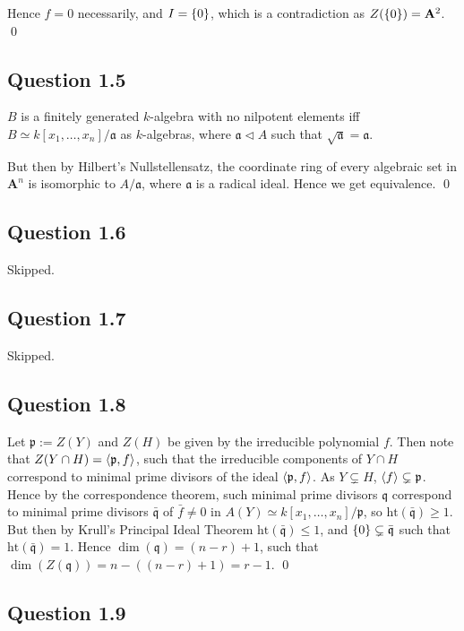 \documentclass{article}
\begin{document}
Hence $f=0$ necessarily, and $I=\{0\}$, which is a contradiction as $Z(\{0\}) = \mathbf{A}^2$. \qed

\subsection*{Question 1.5}

$B$ is a finitely generated $k$-algebra with no nilpotent elements iff $B \simeq k[x_1, \dots, x_n] / \mathfrak a$ as $k$-algebras, where $\mathfrak a \lhd A$ such that $\sqrt{\mathfrak a} = \mathfrak a$.

But then by Hilbert's Nullstellensatz, the coordinate ring of every algebraic set in $\mathbf{A}^n$ is isomorphic to $A/\mathfrak a$, where $\mathfrak a$ is a radical ideal. Hence we get equivalence. \qed

\subsection*{Question 1.6}

Skipped.

\subsection*{Question 1.7}

Skipped.

\subsection*{Question 1.8}

Let $\mathfrak p := Z(Y)$ and $Z(H)$ be given by the irreducible polynomial $f$. Then note that $Z(Y \cap H) = \langle\mathfrak p, f\rangle$, such that the irreducible components of $Y \cap H$ correspond to minimal prime divisors of the ideal $\langle\mathfrak p, f\rangle$. As $Y \subsetneq H$, $\langle f\rangle \subsetneq \mathfrak p$. Hence by the correspondence theorem, such minimal prime divisors $\mathfrak q$ correspond to minimal prime divisors $\bar{\mathfrak q}$ of $\bar f \neq 0$ in $A(Y) \simeq k[x_1,\dots, x_n]/ \mathfrak p$, so $\text{ht}(\bar{\mathfrak q}) \geq 1$. But then by Krull’s Principal Ideal Theorem $\text{ht}(\bar{\mathfrak q}) \leq 1$, and $\{0\} \subsetneq \bar{\mathfrak q}$ such that $\text{ht}(\bar{\mathfrak q}) = 1$. Hence $\dim(\mathfrak q) = (n-r)+1$, such that $\dim(Z(\mathfrak q)) = n - ((n-r)+1) = r-1$. \qed

\subsection*{Question 1.9}
\end{document}
